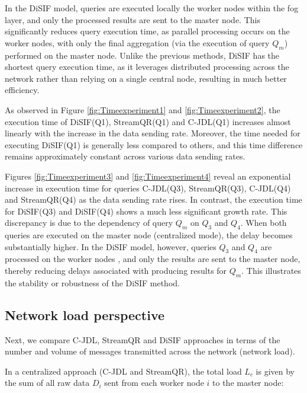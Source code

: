 \documentclass[5p,times]{elsarticle}
\begin{document}
\begin{itemize}
In the DiSIF model, queries are executed locally the worker nodes within the fog layer,
 and only the processed results are sent to the master node.
  This significantly reduces query execution time, as parallel processing occurs
   on the worker nodes, with only the final aggregation (via the execution of query $Q_m$)
    performed on the master node. Unlike the previous methods, DiSIF has the shortest query
     execution time, as it leverages distributed processing across the network rather than
      relying on a single central node, resulting in much better efficiency.




As observed in Figure \ref{fig:Timeexperiment1} and \ref{fig:Timeexperiment2},
 the execution time of DiSIF(Q1), StreamQR(Q1) and C-JDL(Q1) increases almost linearly
  with the increase in the data sending rate. Moreover,
   the time needed for executing DiSIF(Q1) is generally less compared
    to others, and this time difference remains approximately constant across various data
     sending rates.


Figures \ref{fig:Timeexperiment3} and \ref{fig:Timeexperiment4} reveal an exponential
 increase in execution time for queries C-JDL(Q3), StreamQR(Q3), C-JDL(Q4) and StreamQR(Q4)
  as the data sending rate rises. In contrast, the execution time for DiSIF(Q3)
   and DiSIF(Q4) shows a much less significant growth rate. This discrepancy is due
    to the dependency of query $Q_m$ on $Q_3$ and $Q_4$. When both queries are executed
     on the master node (centralized mode), the delay becomes substantially higher.
      In the DiSIF model, however, queries $Q_3$ and $Q_4$ are processed on the worker nodes
      , and only the results are sent to the master node, 
      thereby reducing delays associated with producing results for $Q_m$.
This illustrates the stability or robustness of the DiSIF method.


\end{itemize} 



\subsection{Network load perspective}


Next, we compare C-JDL, StreamQR and DiSIF approaches
 in terms of the number and volume of messages transmitted across the network (network load).

In a centralized approach (C-JDL and StreamQR), the total load \(L_c\) is given by the sum
 of all raw data \(D_i\) sent from each worker node \(i\) to the master node:
\end{document}
